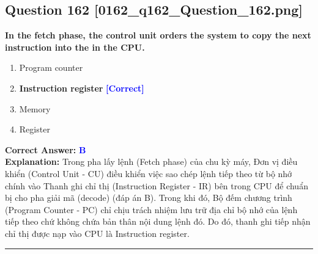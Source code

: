 \documentclass[11pt,a4paper]{article}
\begin{document}
\begin{minipage}{\textwidth}
\subsection*{Question 162 \quad \footnotesize{[0162\_q162\_Question\_162.png]}}
\noindent \textbf{In the fetch phase, the control unit orders the system to copy the next instruction into the in the CPU.}

\begin{enumerate}[label=\Alph*.]
    \item Program counter
    \item \textbf{Instruction register} \hfill \textcolor{blue}{\textbf{[Correct]}}
    \item Memory
    \item Register
\end{enumerate}

\noindent \textbf{Correct Answer:} \textcolor{blue}{\textbf{B}} \\[2pt]
\noindent \textbf{Explanation:} Trong pha lấy lệnh (Fetch phase) của chu kỳ máy, Đơn vị điều khiển (Control Unit - CU) điều khiển việc sao chép lệnh tiếp theo từ bộ nhớ chính vào Thanh ghi chỉ thị (Instruction Register - IR) bên trong CPU để chuẩn bị cho pha giải mã (decode) (đáp án B). Trong khi đó, Bộ đếm chương trình (Program Counter - PC) chỉ chịu trách nhiệm lưu trữ địa chỉ bộ nhớ của lệnh tiếp theo chứ không chứa bản thân nội dung lệnh đó. Do đó, thanh ghi tiếp nhận chỉ thị được nạp vào CPU là Instruction register.

\par\vspace{0.3cm}
\hrule
\vspace{0.3cm}
\end{minipage}
\end{document}
